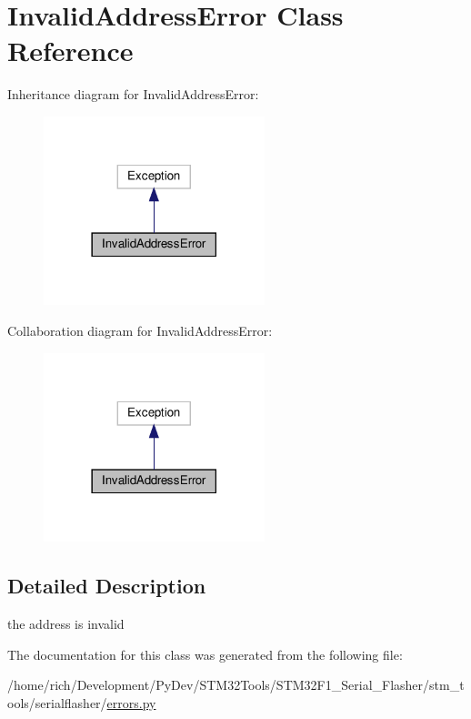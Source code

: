 \hypertarget{classstm__tools_1_1serialflasher_1_1errors_1_1InvalidAddressError}{}\section{Invalid\+Address\+Error Class Reference}
\label{classstm__tools_1_1serialflasher_1_1errors_1_1InvalidAddressError}


Inheritance diagram for Invalid\+Address\+Error\+:
\nopagebreak
\begin{figure}[H]
\begin{center}
\leavevmode
\includegraphics[width=182pt]{classstm__tools_1_1serialflasher_1_1errors_1_1InvalidAddressError__inherit__graph}
\end{center}
\end{figure}


Collaboration diagram for Invalid\+Address\+Error\+:
\nopagebreak
\begin{figure}[H]
\begin{center}
\leavevmode
\includegraphics[width=182pt]{classstm__tools_1_1serialflasher_1_1errors_1_1InvalidAddressError__coll__graph}
\end{center}
\end{figure}


\subsection{Detailed Description}
\begin{DoxyVerb}the address is invalid\end{DoxyVerb}
 

The documentation for this class was generated from the following file\+:\begin{DoxyCompactItemize}
\item 
/home/rich/\+Development/\+Py\+Dev/\+S\+T\+M32\+Tools/\+S\+T\+M32\+F1\+\_\+\+Serial\+\_\+\+Flasher/stm\+\_\+tools/serialflasher/\hyperlink{errors_8py}{errors.\+py}\end{DoxyCompactItemize}
